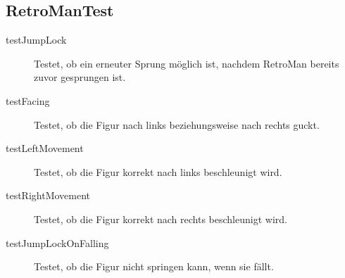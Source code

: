 \documentclass[parskip=full]{scrreprt}
\begin{document}
\subsection{RetroManTest}

\begin{description}
	\item[testJumpLock] Testet, ob ein erneuter Sprung möglich ist, nachdem RetroMan bereits zuvor gesprungen ist.
	\item[testFacing] Testet, ob die Figur nach links beziehungsweise nach rechts guckt.
	\item[testLeftMovement] Testet, ob die Figur korrekt nach links beschleunigt wird.
	\item[testRightMovement] Testet, ob die Figur korrekt nach rechts beschleunigt wird.
	\item[testJumpLockOnFalling] Testet, ob die Figur nicht springen kann, wenn sie fällt.
\end{description}
\end{document}
